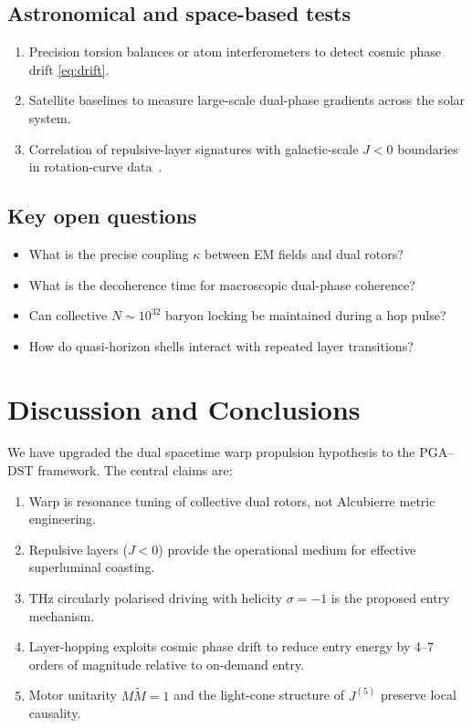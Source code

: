 \documentclass[dvipdfmx,a4paper]{article}
\theoremstyle{definition}
\begin{document}
\subsection{Astronomical and space-based tests}

\begin{enumerate}[leftmargin=2em]
  \item Precision torsion balances or atom interferometers to detect cosmic phase drift \eqref{eq:drift}.
  \item Satellite baselines to measure large-scale dual-phase gradients across the solar system.
  \item Correlation of repulsive-layer signatures with galactic-scale $J<0$ boundaries in rotation-curve data~\cite{dual2025}.
\end{enumerate}

\subsection{Key open questions}

\begin{itemize}[leftmargin=2em]
  \item What is the precise coupling $\kappa$ between EM fields and dual rotors?
  \item What is the decoherence time for macroscopic dual-phase coherence?
  \item Can collective $N\sim 10^{32}$ baryon locking be maintained during a hop pulse?
  \item How do quasi-horizon shells interact with repeated layer transitions?
\end{itemize}

\section{Discussion and Conclusions}
\label{sec:conclusions}

We have upgraded the dual spacetime warp propulsion hypothesis to the PGA--DST framework. The central claims are:

\begin{enumerate}[leftmargin=2em]
  \item Warp is resonance tuning of collective dual rotors, not Alcubierre metric engineering.
  \item Repulsive layers ($J<0$) provide the operational medium for effective superluminal coasting.
  \item THz circularly polarised driving with helicity $\sigma=-1$ is the proposed entry mechanism.
  \item Layer-hopping exploits cosmic phase drift to reduce entry energy by 4--7 orders of magnitude relative to on-demand entry.
  \item Motor unitarity $M\widetilde{M}=1$ and the light-cone structure of $J^{(5)}$ preserve local causality.
\end{enumerate}
\end{document}
